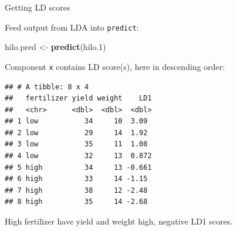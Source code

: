 \documentclass[
  ignorenonframetext,
]{beamer}
\newenvironment{Shaded}{\begin{snugshade}}{\end{snugshade}}
\newcommand{\FloatTok}[1]{\textcolor[rgb]{0.00,0.00,0.81}{#1}}
\newcommand{\KeywordTok}[1]{\textcolor[rgb]{0.13,0.29,0.53}{\textbf{#1}}}
\newcommand{\NormalTok}[1]{#1}
\newcommand{\OperatorTok}[1]{\textcolor[rgb]{0.81,0.36,0.00}{\textbf{#1}}}
\newcommand{\StringTok}[1]{\textcolor[rgb]{0.31,0.60,0.02}{#1}}
\begin{document}
\begin{frame}[fragile]{Getting LD scores}
\protect\hypertarget{getting-ld-scores}{}

Feed output from LDA into \texttt{predict}:

\begin{Shaded}
\begin{Highlighting}[]
\NormalTok{hilo.pred <-}\StringTok{ }\KeywordTok{predict}\NormalTok{(hilo}\FloatTok{.1}\NormalTok{)}
\end{Highlighting}
\end{Shaded}

Component \texttt{x} contains LD score(s), here in descending order:

\footnotesize

\begin{Shaded}
\end{Shaded}

\begin{verbatim}
## # A tibble: 8 x 4
##   fertilizer yield weight    LD1
##   <chr>      <dbl>  <dbl>  <dbl>
## 1 low           34     10  3.09 
## 2 low           29     14  1.92 
## 3 low           35     11  1.08 
## 4 low           32     13  0.872
## 5 high          34     13 -0.661
## 6 high          33     14 -1.15 
## 7 high          38     12 -2.48 
## 8 high          35     14 -2.68
\end{verbatim}

\normalsize

High fertilizer have yield and weight high, negative LD1 scores.

\end{frame}
\end{document}
